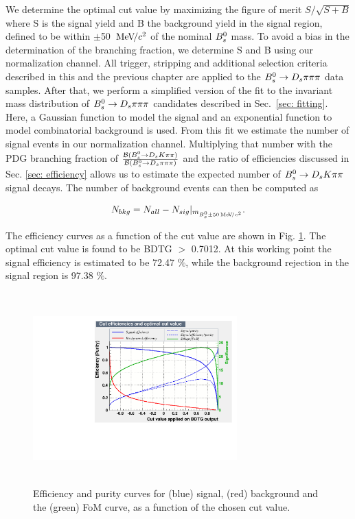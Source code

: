        
We determine the optimal cut value by maximizing the figure of merit $S/\sqrt{S+B}$ where S is the signal yield and B the background yield in the signal region, defined to be within $\pm$50 ${\mathrm{\,Me\kern -0.1em V\!/}c^2}$ of the nominal ${{B}^0_{s}}$ mass. 
To avoid a bias in the determination of the branching fraction, we determine S and B using our normalization channel. 
All trigger, stripping and additional selection criteria described in this and the previous chapter are applied to the ${{B}^0_{s}}\rightarrow{\ensuremath{{D}_{s}}}{\ensuremath{\pi}}{\ensuremath{\pi}}{\ensuremath{\pi}}$ data samples. 
After that, we perform a simplified version of the fit to the invariant mass distribution of ${{B}^0_{s}}\rightarrow{\ensuremath{{D}_{s}}}{\ensuremath{\pi}}{\ensuremath{\pi}}{\ensuremath{\pi}}$ candidates described in Sec.~\ref{sec: fitting}.
Here, a Gaussian function to model the signal and an exponential function to model combinatorial background is used.
From this fit we estimate the number of signal events in our normalization channel. 
Multiplying that number with the PDG branching fraction of $\frac{\mathcal{B}({{B}^0_{s}}\rightarrow{\ensuremath{{D}_{s}}}{\ensuremath{K}}{\ensuremath{\pi}}{\ensuremath{\pi}})}{\mathcal{B}({{B}^0_{s}}\rightarrow{\ensuremath{{D}_{s}}}{\ensuremath{\pi}}{\ensuremath{\pi}}{\ensuremath{\pi}})}$ and the ratio of efficiencies discussed in Sec. \ref{sec: efficiency} allows us to estimate the expected number of ${{B}^0_{s}}\rightarrow{\ensuremath{{D}_{s}}}{\ensuremath{K}}{\ensuremath{\pi}}{\ensuremath{\pi}}$ signal decays. The number of background events can then be computed as

\begin{equation}
 N_{bkg}=N_{all}-N_{sig}|_{m_{{{B}^0_{s}}\pm50{\mathrm{\,Me\kern -0.1em V\!/}c^2}}}.   
\end{equation}

The efficiency curves as a function of the cut value are shown in Fig. \ref{fig:BDT_Efficiency}. 
The optimal cut value is found to be BDTG $>$ 0.7012. At this working point the signal efficiency is estimated to be 72.47 $\%$, while the background rejection in the signal region is 97.38 $\%$. 


\begin{figure}[h]
\includegraphics[height=7.4cm,width=0.7\textwidth]{figs/BDT_CutEfficiency.pdf}
\caption{Efficiency and purity curves for (blue) signal, (red) background and the (green) FoM curve, as a function of the chosen cut value.}
\label{fig:BDT_Efficiency}
\end{figure}





